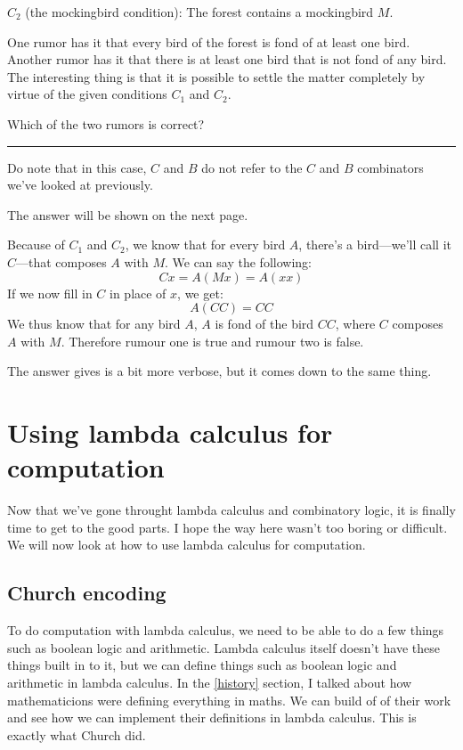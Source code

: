 \documentclass[11pt]{article}
\begin{document}
\(C_{2}\) (the mockingbird condition): The forest contains a mockingbird \(M\). 

One rumor has it that every bird of the forest is fond of at least one bird.
Another rumor has it that there is at least one bird that is not fond of any
bird. The interesting thing is that it is possible to settle the matter
completely by virtue of the given conditions \(C_{1}\) and \(C_{2}\).

Which of the two rumors is correct? 

\begin{center}
\rule{15cm}{0.5pt}
\end{center}
\setlength{\leftskip}{0pt}
\setlength{\rightskip}{0pt}

Do note that in this case, \(C\) and \(B\) do not refer to the \(C\) and \(B\)
combinators we've looked at previously.

The answer will be shown on the next page.

\newpage

Because of \(C_{1}\) and \(C_{2}\), we know that for every bird \(A\), there's
a bird---we'll call it \(C\)---that composes \(A\) with \(M\). We can say the
following:
\[Cx=A(Mx)=A(xx)\] 
If we now fill in \(C\) in place of \(x\), we get:
\[A(CC)=CC\]
We thus know that for any bird \(A\), \(A\) is fond of the bird \(CC\), where
\(C\) composes \(A\) with \(M\). Therefore rumour one is true and rumour two is
false.

The answer \textcite{smullyan2000} gives is a bit more verbose, but it comes
down to the same thing.

\section{Using lambda calculus for computation}\label{computation}

Now that we've gone throught lambda calculus and combinatory logic, it is
finally time to get to the good parts. I hope the way here wasn't too boring or
difficult. We will now look at how to use lambda calculus for computation.

\subsection{Church encoding}

To do computation with lambda calculus, we need to be able to do a few things
such as boolean logic and arithmetic. Lambda calculus itself doesn't have these
things built in to it, but we can define things such as boolean logic and
arithmetic in lambda calculus. In the \ref{history} section, I talked about how
mathematicions were defining everything in maths. We can build of of their work
and see how we can implement their definitions in lambda calculus. This is
exactly what Church did.
\end{document}
